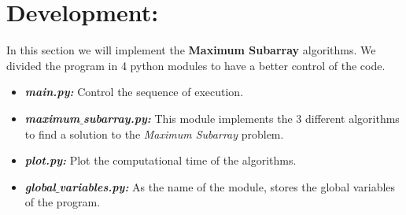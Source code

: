 \section{Development:}

In this section we will implement the {\bfseries Maximum Subarray} algorithms. We divided the program in 4 python modules to have a better control of the code.

\begin{itemize}
\item {\bfseries\itshape main.py:} Control the sequence of execution.
\item {\bfseries\itshape maximum$\_$subarray.py:} This module implements the 3 different algorithms to find a solution to the {\itshape Maximum Subarray} problem.
\item {\bfseries\itshape plot.py:} Plot the computational time of the algorithms.
\item {\bfseries\itshape global$\_$variables.py:} As the name of the module, stores the global variables of the program.
\end{itemize}

{\bfseries\itshape\color{carmine}{Observation:}} {\itshape\color{carmine}{The code that we will show bellow doesn't include the counter in each line of the algorithm, this because to make notice only the essential parts. For that, see subsection 3.4.}}

\pagebreak
